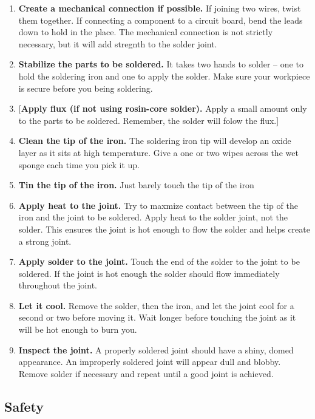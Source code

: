\documentclass[]{book}
\providecommand{\tightlist}{%
  \setlength{\itemsep}{0pt}\setlength{\parskip}{0pt}}
\begin{document}
\begin{enumerate}
\def\labelenumi{\arabic{enumi}.}
\tightlist
\item
  \textbf{Create a mechanical connection if possible.} If joining two wires, twist them together. If connecting a component to a circuit board, bend the leads down to hold in the place. The mechanical connection is not strictly necessary, but it will add stregnth to the solder joint.
\item
  \textbf{Stabilize the parts to be soldered.} It takes two hands to solder -- one to hold the soldering iron and one to apply the solder. Make sure your workpiece is secure before you being soldering.
\item
  {[}\textbf{Apply flux (if not using rosin-core solder).} Apply a small amount only to the parts to be soldered. Remember, the solder will folow the flux.{]}
\item
  \textbf{Clean the tip of the iron.} The soldering iron tip will develop an oxide layer as it sits at high temperature. Give a one or two wipes across the wet sponge each time you pick it up.
\item
  \textbf{Tin the tip of the iron.} Just barely touch the tip of the iron
\item
  \textbf{Apply heat to the joint.} Try to maxmize contact between the tip of the iron and the joint to be soldered. Apply heat to the solder joint, not the solder. This ensures the joint is hot enough to flow the solder and helps create a strong joint.
\item
  \textbf{Apply solder to the joint.} Touch the end of the solder to the joint to be soldered. If the joint is hot enough the solder should flow immediately throughout the joint.
\item
  \textbf{Let it cool.} Remove the solder, then the iron, and let the joint cool for a second or two before moving it. Wait longer before touching the joint as it will be hot enough to burn you.
\item
  \textbf{Inspect the joint.} A properly soldered joint should have a shiny, domed appearance. An improperly soldered joint will appear dull and blobby. Remove solder if necessary and repeat until a good joint is achieved.
\end{enumerate}

\hypertarget{safety}{%
\subsection{Safety}\label{safety}}
\end{document}
